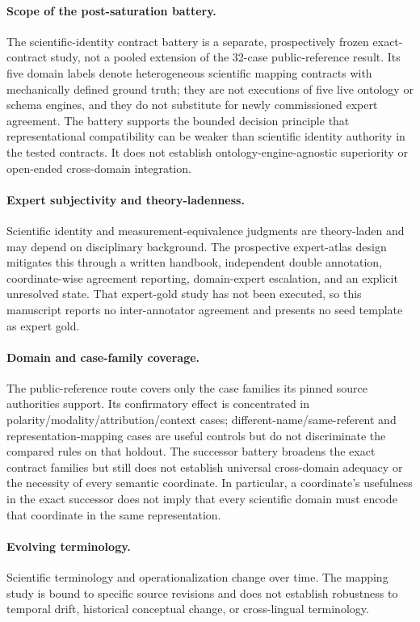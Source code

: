 \paragraph{Scope of the post-saturation battery.}
The scientific-identity contract battery is a separate, prospectively frozen
exact-contract study, not a pooled extension of the 32-case public-reference
result. Its five domain labels denote heterogeneous scientific mapping
contracts with mechanically defined ground truth; they are not executions of
five live ontology or schema engines, and they do not substitute for newly
commissioned expert agreement. The battery supports the bounded decision
principle that representational compatibility can be weaker than scientific
identity authority in the tested contracts. It does not establish
ontology-engine-agnostic superiority or open-ended cross-domain integration.

\paragraph{Expert subjectivity and theory-ladenness.}
Scientific identity and measurement-equivalence judgments are theory-laden and
may depend on disciplinary background. The prospective expert-atlas design
mitigates this through a written handbook, independent double annotation,
coordinate-wise agreement reporting, domain-expert escalation, and an explicit
unresolved state. That expert-gold study has not been executed, so this
manuscript reports no inter-annotator agreement and presents no seed template
as expert gold.

\paragraph{Domain and case-family coverage.}
The public-reference route covers only the case families its pinned source
authorities support. Its confirmatory effect is concentrated in
polarity/modality/attribution/context cases; different-name/same-referent and
representation-mapping cases are useful controls but do not discriminate the
compared rules on that holdout. The successor battery broadens the exact
contract families but still does not establish universal cross-domain adequacy
or the necessity of every semantic coordinate. In particular, a coordinate's
usefulness in the exact successor does not imply that every scientific domain
must encode that coordinate in the same representation.

\paragraph{Evolving terminology.}
Scientific terminology and operationalization change over time. The mapping
study is bound to specific source revisions and does not establish robustness
to temporal drift, historical conceptual change, or cross-lingual terminology.

